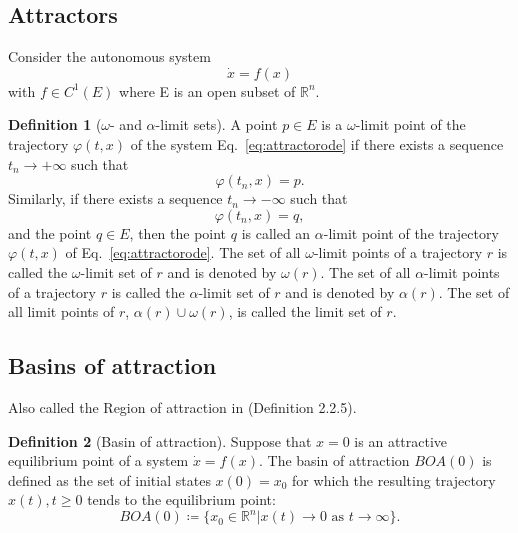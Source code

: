 \documentclass{article}
\theoremstyle{definition}
\newtheorem{definition}{Definition}
\theoremstyle{remark}
\newcommand{\reals}{\mathbb{R}}
\newcounter{ct}
\begin{document}
\subsection{Attractors}
Consider the autonomous system
\begin{equation}\label{eq:attractorode}
\dot x = f(x)
\end{equation}
with \(f \in C^1(E)\) where E is an open subset of \(\reals^n\). 

\begin{definition}[\(\omega\)- and \(\alpha\)-limit sets]
A point \( p \in E \) is a \(\omega\)-limit point of the trajectory \( \varphi(t, x) \) of the system Eq.~\ref{eq:attractorode} if there exists a sequence \( t_n \to +\infty \) such that
\[
\varphi(t_n, x) = p.
\]
Similarly, if there exists a sequence \( t_n \to -\infty \) such that
\[
\varphi(t_n, x) = q,
\]
and the point \( q \in E \), then the point \( q \) is called an \(\alpha\)-limit point of the trajectory \( \varphi(t, x) \) of  Eq.~\ref{eq:attractorode}. The set of all \(\omega\)-limit points of a trajectory \( r \) is called the \(\omega\)-limit set of \( r \) and is denoted by \( \omega(r) \). The set of all \(\alpha\)-limit points of a trajectory \( r \) is called the \(\alpha\)-limit set of \( r \) and is denoted by \( \alpha(r) \). The set of all limit points of \( r \), \( \alpha(r) \cup \omega(r) \), is called the limit set of \( r \).
\end{definition}


\subsection{Basins of attraction}
\citep{milnor1985attractor}
\citep{hirsch1995computing}

Also called the Region of attraction in \citep{garces2012strategies} (Definition 2.2.5).
\begin{definition}[Basin of attraction]
Suppose that $x=0$ is an attractive equilibrium point of a system $\dot x = f(x)$.
The basin of attraction $BOA(0)$ is defined as the set of initial states $x(0)=x_0$ for which the resulting trajectory $x(t), t\geq 0$ tends to the equilibrium point:
\begin{equation}
BOA(0) \coloneqq \{x_0\in \reals^n|x(t)\rightarrow0\text{ as } t\rightarrow\infty\}.
\end{equation}

\end{definition}
\end{document}
